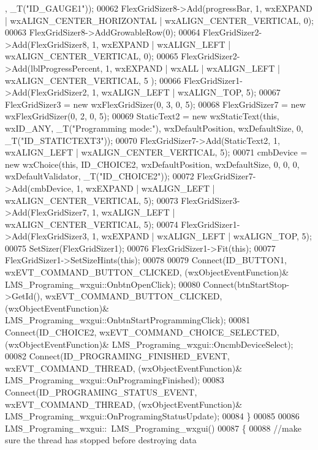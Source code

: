 \begin{DoxyCode}
      , \_T(\textcolor{stringliteral}{"ID\_GAUGE1"}));
00062     FlexGridSizer8->Add(progressBar, 1, wxEXPAND | wxALIGN\_CENTER\_HORIZONTAL | wxALIGN\_CENTER\_VERTICAL, 0);
00063     FlexGridSizer8->AddGrowableRow(0);
00064     FlexGridSizer2->Add(FlexGridSizer8, 1, wxEXPAND | wxALIGN\_LEFT | wxALIGN\_CENTER\_VERTICAL, 0);
00065     FlexGridSizer2->Add(lblProgressPercent, 1, wxEXPAND | wxALL | wxALIGN\_LEFT | wxALIGN\_CENTER\_VERTICAL, 5
      );
00066     FlexGridSizer1->Add(FlexGridSizer2, 1, wxALIGN\_LEFT | wxALIGN\_TOP, 5);
00067     FlexGridSizer3 = \textcolor{keyword}{new} wxFlexGridSizer(0, 3, 0, 5);
00068     FlexGridSizer7 = \textcolor{keyword}{new} wxFlexGridSizer(0, 2, 0, 5);
00069     StaticText2 = \textcolor{keyword}{new} wxStaticText(\textcolor{keyword}{this}, wxID\_ANY, \_T(\textcolor{stringliteral}{"Programming mode:"}), wxDefaultPosition, 
      wxDefaultSize, 0, \_T(\textcolor{stringliteral}{"ID\_STATICTEXT3"}));
00070     FlexGridSizer7->Add(StaticText2, 1, wxALIGN\_LEFT | wxALIGN\_CENTER\_VERTICAL, 5);
00071     cmbDevice = \textcolor{keyword}{new} wxChoice(\textcolor{keyword}{this}, ID\_CHOICE2, wxDefaultPosition, wxDefaultSize, 0, 0, 0, 
      wxDefaultValidator, \_T(\textcolor{stringliteral}{"ID\_CHOICE2"}));
00072     FlexGridSizer7->Add(cmbDevice, 1, wxEXPAND | wxALIGN\_LEFT | wxALIGN\_CENTER\_VERTICAL, 5);
00073     FlexGridSizer3->Add(FlexGridSizer7, 1, wxALIGN\_LEFT | wxALIGN\_CENTER\_VERTICAL, 5);
00074     FlexGridSizer1->Add(FlexGridSizer3, 1, wxEXPAND | wxALIGN\_LEFT | wxALIGN\_TOP, 5);
00075     SetSizer(FlexGridSizer1);
00076     FlexGridSizer1->Fit(\textcolor{keyword}{this});
00077     FlexGridSizer1->SetSizeHints(\textcolor{keyword}{this});
00078 
00079     Connect(ID\_BUTTON1, wxEVT\_COMMAND\_BUTTON\_CLICKED, (wxObjectEventFunction)&
      LMS_Programing_wxgui::OnbtnOpenClick);
00080     Connect(btnStartStop->GetId(), wxEVT\_COMMAND\_BUTTON\_CLICKED, (wxObjectEventFunction)&
      LMS_Programing_wxgui::OnbtnStartProgrammingClick);
00081     Connect(ID\_CHOICE2, wxEVT\_COMMAND\_CHOICE\_SELECTED, (wxObjectEventFunction)&
      LMS_Programing_wxgui::OncmbDeviceSelect);
00082     Connect(ID\_PROGRAMING\_FINISHED\_EVENT, wxEVT\_COMMAND\_THREAD, (wxObjectEventFunction)&
      LMS_Programing_wxgui::OnProgramingFinished);
00083     Connect(ID\_PROGRAMING\_STATUS\_EVENT, wxEVT\_COMMAND\_THREAD, (wxObjectEventFunction)&
      LMS_Programing_wxgui::OnProgramingStatusUpdate);
00084 \}
00085 
00086 LMS_Programing_wxgui::~LMS_Programing_wxgui()
00087 \{
00088     \textcolor{comment}{//make sure the thread has stopped before destroying data}

\end{DoxyCode}
